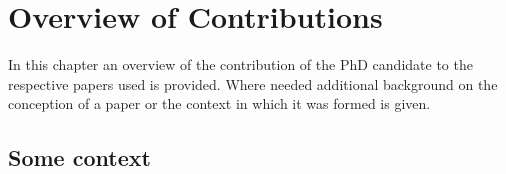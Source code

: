 %
%
%




\chapter{Overview of Contributions}\label{ch:contribution}

In this chapter an overview of the contribution of the PhD candidate to the respective papers used is provided. Where needed additional background on the conception of a paper or the context in which it was formed is given.



\section{Some context}
\lipsum[2-4]

